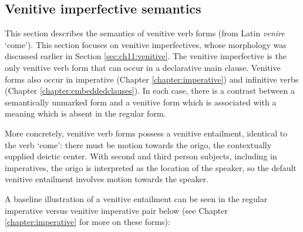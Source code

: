 



%

%
%
%
%
%
%
%
%
%
%

 
% 
%
%
%
%

\subsection{Venitive imperfective semantics}\label{sec:ch11:venitivesem}

This section describes the semantics of venitive verb forms (from Latin \textit{venire} `come'). This section focuses on venitive imperfectives, whose morphology was discussed earlier in Section \ref{sec:ch11:venitive}. The venitive imperfective is the only venitive verb form that can occur in a declarative main clause. Venitive forms also occur in imperative (Chapter \ref{chapter:imperative}) and infinitive verbs (Chapter \ref{chapter:embeddedclauses}). In each case, there is a contrast between a semantically unmarked form and a venitive form which is associated with a meaning which is absent in the regular form.

More concretely, venitive verb forms possess a venitive entailment, identical to the verb `come': there must be motion towards the origo, the contextually supplied deictic center. With second and third person subjects, including in imperatives, the origo is interpreted as the location of the speaker, so the default venitive entailment involves motion towards the speaker.

A baseline illustration of a venitive entailment can be seen in the regular imperative versus venitive imperative pair below (see Chapter \ref{chapter:imperative} for more on these forms):


